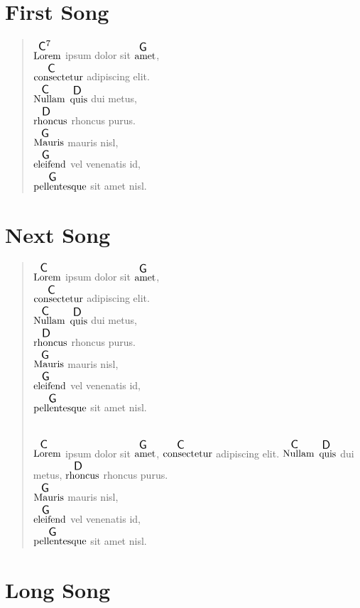 \documentclass[twocolumn]{article}
\newcommand{\ch}[2]{$\overset{ \resizebox*{!}{1.2\height}{\textsf{#2}} }{\text{#1}}$}
\begin{document}
\section*{First Song}

\begin{verse}

\ch{Lorem}{C$^7$} ipsum dolor sit \ch{amet}{G}, \\
\ch{consectetur}{C} adipiscing elit.\\
\ch{Nullam}{C} \ch{quis}{D} dui metus, \\
\ch{rhoncus}{D} rhoncus purus. \\
\ch{Mauris}{G} mauris nisl, \\
\ch{eleifend}{G} vel venenatis id, \\
\ch{pellentesque}{G} sit amet nisl.

\end{verse}

\section*{Next Song}

\begin{verse}

\ch{Lorem}{C} ipsum dolor sit \ch{amet}{G}, \\
\ch{consectetur}{C} adipiscing elit.\\
\ch{Nullam}{C} \ch{quis}{D} dui metus, \\
\ch{rhoncus}{D} rhoncus purus. \\
\ch{Mauris}{G} mauris nisl, \\
\ch{eleifend}{G} vel venenatis id, \\
\ch{pellentesque}{G} sit amet nisl.

~\\

\ch{Lorem}{C} ipsum dolor sit \ch{amet}{G}, 
\ch{consectetur}{C} adipiscing elit.
\ch{Nullam}{C} \ch{quis}{D} dui metus, 
\ch{rhoncus}{D} rhoncus purus. \\
\ch{Mauris}{G} mauris nisl, \\
\ch{eleifend}{G} vel venenatis id, \\
\ch{pellentesque}{G} sit amet nisl.

\end{verse}

\section*{Long Song}
\end{document}

